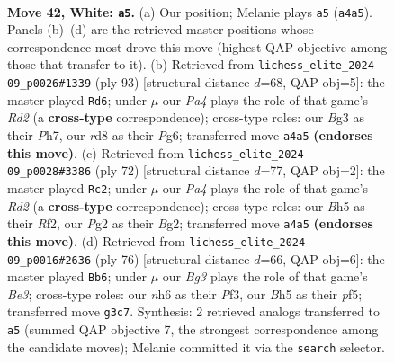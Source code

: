 \documentclass[11pt]{article}
\begin{document}
\clearpage

\begin{figure}[p]\centering
\begin{subfigure}{0.46\textwidth}\centering
\resizebox{\linewidth}{!}{%
\newchessgame
\chessboard[
  setfen={3r3r/p6p/5k1n/6bB/P7/1Pp3BP/R1P3PK/1R6 w - - 5 42},
  showmover=false,
  pgfstyle=straightmove, color=movearrow, markmove={a4-a5}
]}
\caption{}
\end{subfigure}\hfill
\begin{subfigure}{0.46\textwidth}\centering
\resizebox{\linewidth}{!}{%
\newchessgame
\chessboard[
  setfen={8/p2r3p/1p3bpk/2p5/2P1RK2/5R2/P6P/8 b - - 33 47},
  showmover=false,
  pgfstyle=straightmove, color=movearrow, markmove={d7-d6}
]}
\caption{}
\end{subfigure}
\\[4pt]
\begin{subfigure}{0.46\textwidth}\centering
\resizebox{\linewidth}{!}{%
\newchessgame
\chessboard[
  setfen={1r6/3b2k1/3p2p1/3P4/4P3/p5PP/P2R1RBK/1r6 w - - 0 37},
  showmover=false,
  pgfstyle=straightmove, color=movearrow, markmove={d2-c2}
]}
\caption{}
\end{subfigure}\hfill
\begin{subfigure}{0.46\textwidth}\centering
\resizebox{\linewidth}{!}{%
\newchessgame
\chessboard[
  setfen={r5k1/6p1/2p1b3/r4pPR/8/4BPP1/P3PK2/7R w - f6 0 39},
  showmover=false,
  pgfstyle=straightmove, color=movearrow, markmove={e3-b6}
]}
\caption{}
\end{subfigure}
\caption{\textbf{Move 42, White: \texttt{a5}.} (a) Our position; Melanie plays \texttt{a5} (\texttt{a4a5}). Panels (b)--(d) are the retrieved master positions whose correspondence most drove this move (highest QAP objective among those that transfer to it). (b) Retrieved from \texttt{lichess\_elite\_2024-09\_p0026\#1339} (ply 93) [structural distance $d$=68, QAP obj=5]: the master played \texttt{Rd6}; under $\mu$ our \emph{Pa4} plays the role of that game's \emph{Rd2} (a \textbf{cross-type} correspondence); cross-type roles: our \emph{B}g3 as their \emph{P}h7, our \emph{r}d8 as their \emph{P}g6; transferred move \texttt{a4a5} \textbf{(endorses this move)}. (c) Retrieved from \texttt{lichess\_elite\_2024-09\_p0028\#3386} (ply 72) [structural distance $d$=77, QAP obj=2]: the master played \texttt{Rc2}; under $\mu$ our \emph{Pa4} plays the role of that game's \emph{Rd2} (a \textbf{cross-type} correspondence); cross-type roles: our \emph{B}h5 as their \emph{R}f2, our \emph{P}g2 as their \emph{B}g2; transferred move \texttt{a4a5} \textbf{(endorses this move)}. (d) Retrieved from \texttt{lichess\_elite\_2024-09\_p0016\#2636} (ply 76) [structural distance $d$=66, QAP obj=6]: the master played \texttt{Bb6}; under $\mu$ our \emph{Bg3} plays the role of that game's \emph{Be3}; cross-type roles: our \emph{n}h6 as their \emph{P}f3, our \emph{B}h5 as their \emph{p}f5; transferred move \texttt{g3c7}. Synthesis: 2 retrieved analogs transferred to \texttt{a5} (summed QAP objective 7, the strongest correspondence among the candidate moves); Melanie committed it via the \texttt{search} selector.}
\label{fig:thought-m82}
\end{figure}
\end{document}
